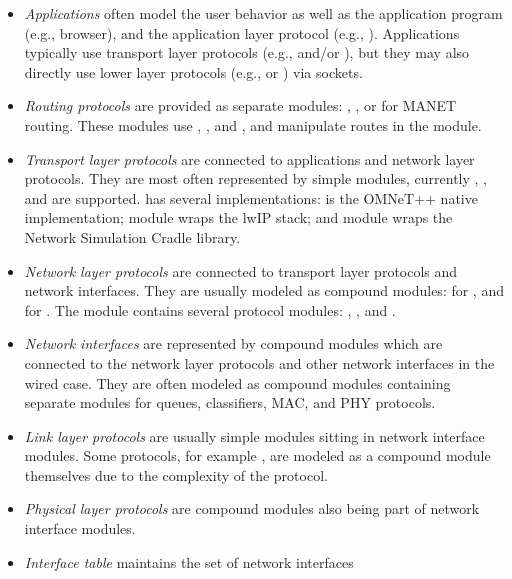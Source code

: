 \begin{itemize}
  \item \emph{Applications} often model the user behavior as well as the
     application program (e.g., browser), and the application layer protocol
     (e.g., ). Applications typically use transport layer
     protocols (e.g.,  and/or ), but they may
     also directly use lower layer protocols (e.g.,  or
     ) via sockets.
  \item \emph{Routing protocols} are provided as separate modules:
     , , or  for MANET routing.
     These modules use , , and ,
     and manipulate routes in the  module.
  \item \emph{Transport layer protocols} are connected to applications and
     network layer protocols. They are most often represented by simple
     modules, currently , , and 
     are supported.  has several implementations: 
     is the OMNeT++ native implementation;  module wraps the
     lwIP  stack; and  module wraps the
     Network Simulation Cradle library.
  \item \emph{Network layer protocols} are connected to transport layer
     protocols and network interfaces. They are usually modeled as compound
     modules:  for , and
      for . The 
     module contains several protocol modules: , ,
     and .
  \item \emph{Network interfaces} are represented by compound modules
     which are connected to the network layer protocols and other network
     interfaces in the wired case. They are often modeled as compound modules
     containing separate modules for queues, classifiers, MAC, and PHY protocols.
  \item \emph{Link layer protocols} are usually simple modules sitting
     in network interface modules. Some protocols, for example
     , are modeled as a compound module themselves
     due to the complexity of the protocol.
  \item \emph{Physical layer protocols} are compound modules also being part
     of network interface modules.
  \item \emph{Interface table} maintains the set of network interfaces

\end{itemize}
